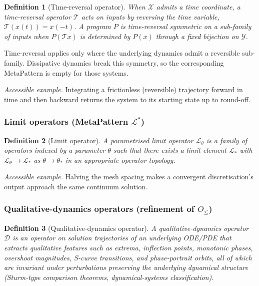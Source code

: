 \documentclass[acmsmall,screen,review]{acmart}
\newtheorem{definition}{Definition}
\begin{document}
\begin{definition}[Time-reversal operator]
When $\mathcal{X}$ admits a time coordinate, a \emph{time-reversal operator} $\mathcal{T}$ acts on inputs by reversing the time variable, $\mathcal{T}(x(t)) = x(-t)$. A program $P$ is \emph{time-reversal symmetric} on a sub-family of inputs when $P(\mathcal{T} x)$ is determined by $P(x)$ through a fixed bijection on $\mathcal{Y}$.
\end{definition}

Time-reversal applies only where the underlying dynamics admit a reversible sub-family. Dissipative dynamics break this symmetry, so the corresponding MetaPattern is empty for those systems.

\emph{Accessible example.} Integrating a frictionless (reversible) trajectory forward in time and then backward returns the system to its starting state up to round-off.

\subsubsection{Limit operators (MetaPattern $\mathcal{L}^{*}$)}

\begin{definition}[Limit operator]
A \emph{parametrised limit operator} $\mathcal{L}_\theta$ is a family of operators indexed by a parameter $\theta$ such that there exists a limit element $\mathcal{L}_*$ with $\mathcal{L}_\theta \to \mathcal{L}_*$ as $\theta \to \theta_*$ in an appropriate operator topology.
\end{definition}

\emph{Accessible example.} Halving the mesh spacing makes a convergent discretisation's output approach the same continuum solution.

\subsubsection{Qualitative-dynamics operators (refinement of $O_{\le}$)}

\begin{definition}[Qualitative-dynamics operator]
A \emph{qualitative-dynamics operator} $\mathcal{D}$ is an operator on solution trajectories of an underlying ODE/PDE that extracts qualitative features such as extrema, inflection points, monotonic phases, overshoot magnitudes, S-curve transitions, and phase-portrait orbits, all of which are invariant under perturbations preserving the underlying dynamical structure (Sturm-type comparison theorems, dynamical-systems classification).
\end{definition}
\end{document}
